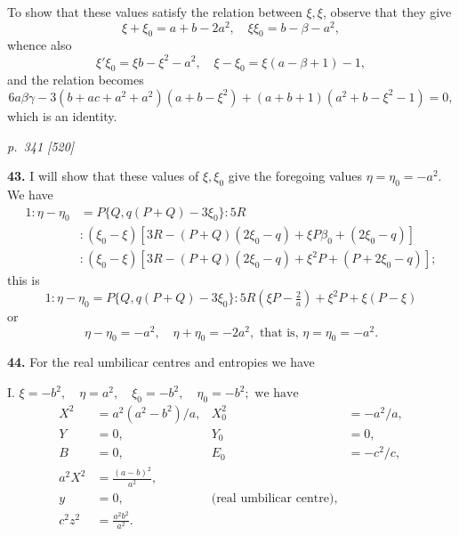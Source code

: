 \documentclass[11pt,a4paper]{book}
\begin{document}
To show that these values satisfy the relation between $\xi, \xi$, observe that they give
\[
\xi + \xi_0 = a + b - 2a^2,\quad \xi\xi_0 = b - \beta - a^2,
\]
whence also
\[
\xi'\xi_0 = \xi b - \xi^2 - a^2,\quad \xi - \xi_0 = \xi(a - \beta + 1) - 1,
\]
and the relation becomes
\[
6a\beta\gamma - 3(b + ac + a^2 + a^2)(a + b - \xi^2) + (a + b + 1)(a^2 + b - \xi^2 - 1) = 0,
\]
which is an identity.

\clearpage

\bigskip
\textit{p.~341 [520]}
\smallskip

\textbf{43.} I will show that these values of $\xi, \xi_0$ give the foregoing values $\eta = \eta_0 = -a^2$. We have
\begin{align*}
1 : \eta - \eta_0 &= P\{Q, q(P + Q) - 3\xi_0\} : 5R \\
&: (\xi_0 - \xi) [3R - (P + Q)(2\xi_0 - q) + \xi P\beta_0 + (2\xi_0 - q)] \\
&: (\xi_0 - \xi) [3R - (P + Q)(2\xi_0 - q) + \xi^2 P + (P + 2\xi_0 - q)];
\end{align*}
this is
\[
1 : \eta - \eta_0 = P\{Q, q(P + Q) - 3\xi_0\} : 5R\!\left(\xi P - \tfrac{2}{a}\right) + \xi^2 P + \xi(P - \xi)
\]
or
\[
\eta - \eta_0 = -a^2,\quad \eta + \eta_0 = -2a^2,\text{ that is, } \eta = \eta_0 = -a^2.
\]

\textbf{44.} For the real umbilicar centres and entropies we have

I. $\xi = -b^2,\quad \eta = a^2,\quad \xi_0 = -b^2,\quad \eta_0 = -b^2;\text{ we have}$
\begin{align*}
X^2 &= a^2(a^2 - b^2)/a, &
X_0^2 &= -a^2/a, \\
Y &= 0, & Y_0 &= 0,\\
B &= 0, & E_0 &= -c^2/c,\\
a^2 X^2 &= \tfrac{(a - b)^2}{a^2},\\
y &= 0, & \text{(real umbilicar centre)},\\
c^2 z^2 &= \tfrac{a^2 b^2}{a^2}.
\end{align*}
\end{document}
